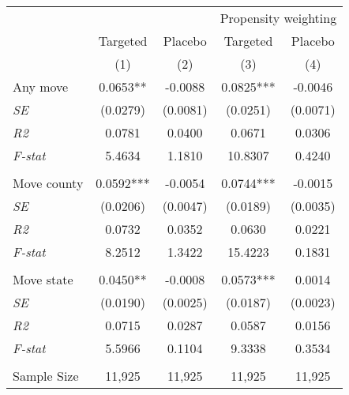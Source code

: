 \begin{tabular}{lcccc}
\toprule
\toprule
 & & & \multicolumn{2}{c}{Propensity weighting}  \\
 & Targeted & Placebo & Targeted & Placebo \\
 & (1) & (2)  & (3) & (4)  \\
\midrule 
 Any move & 0.0653** & -0.0088 & 0.0825*** & -0.0046 \\
 \textit{SE} & (0.0279) & (0.0081) & (0.0251) & (0.0071) \\
 \textit{R2} & 0.0781 & 0.0400 & 0.0671 & 0.0306  \\
 \textit{F-stat} & 5.4634 & 1.1810 & 10.8307 & 0.4240  \\
\\
 Move county & 0.0592*** & -0.0054 & 0.0744*** & -0.0015 \\
 \textit{SE} & (0.0206) & (0.0047) & (0.0189) & (0.0035) \\
 \textit{R2} & 0.0732 & 0.0352 & 0.0630 & 0.0221  \\
 \textit{F-stat} & 8.2512 & 1.3422 & 15.4223 & 0.1831  \\
\\
 Move state & 0.0450** & -0.0008 & 0.0573*** & 0.0014 \\
 \textit{SE} & (0.0190) & (0.0025) & (0.0187) & (0.0023) \\
 \textit{R2} & 0.0715 & 0.0287 & 0.0587 & 0.0156  \\
 \textit{F-stat} & 5.5966 & 0.1104 & 9.3338 & 0.3534  \\
\\
Sample Size  & 11,925  & 11,925  & 11,925  & 11,925 \\
\bottomrule
\bottomrule
\end{tabular}